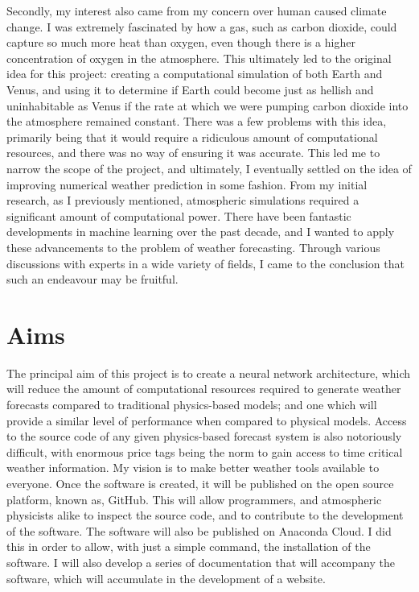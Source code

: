 Secondly, my interest also came from my concern over human caused climate change. I was extremely fascinated by how a gas, such as carbon dioxide, could capture so much more heat than oxygen, even though there is a higher concentration of oxygen in the atmosphere. This ultimately led to the original idea for this project: creating a computational simulation of both Earth and Venus, and using it to determine if Earth could become just as hellish and uninhabitable as Venus if the rate at which we were pumping carbon dioxide into the atmosphere remained constant. There was a few problems with this idea, primarily being that it would require a ridiculous amount of computational resources, and there was no way of ensuring it was accurate. This led me to narrow the scope of the project, and ultimately, I eventually settled on the idea of improving numerical weather prediction in some fashion. From my initial research, as I previously mentioned, atmospheric simulations required a significant amount of computational power. There have been fantastic developments in machine learning over the past decade, and I wanted to apply these advancements to the problem of weather forecasting. Through various discussions with experts in a wide variety of fields, I came to the conclusion that such an endeavour may be fruitful.

\section{Aims}
The principal aim of this project is to create a neural network architecture, which will reduce the amount of computational resources required to generate weather forecasts compared to traditional physics-based models; and one which will provide a similar level of performance when compared to physical models. Access to the source code of any given physics-based forecast system is also notoriously difficult, with enormous price tags being the norm to gain access to time critical weather information. My vision is to make better weather tools available to everyone. Once the software is created, it will be published on the open source platform, known as, GitHub. This will allow programmers, and atmospheric physicists alike to inspect the source code, and to contribute to the development of the software. The software will also be published on Anaconda Cloud. I did this in order to allow, with just a simple command, the installation of the software. I will also develop a series of documentation that will accompany the software, which will accumulate in the development of a website.


